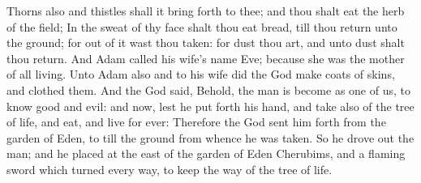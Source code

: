 \begin{biblechapter}
\verse Thorns also and thistles shall it bring forth to thee; and thou shalt eat the herb of the field;
\verse In the sweat of thy face shalt thou eat bread, till thou return unto the ground; for out of it wast thou taken: for dust thou art, and unto dust shalt thou return.
\verse And Adam called his wife's name Eve; because she was the mother of all living.
\verse Unto Adam also and to his wife did the \LORD God make coats of skins, and clothed them.
\verse And the \LORD God said, Behold, the man is become as one of us, to know good and evil: and now, lest he put forth his hand, and take also of the tree of life, and eat, and live for ever:
\verse Therefore the \LORD God sent him forth from the garden of Eden, to till the ground from whence he was taken.
\verse So he drove out the man; and he placed at the east of the garden of Eden Cherubims, and a flaming sword which turned every way, to keep the way of the tree of life.
\end{biblechapter}

